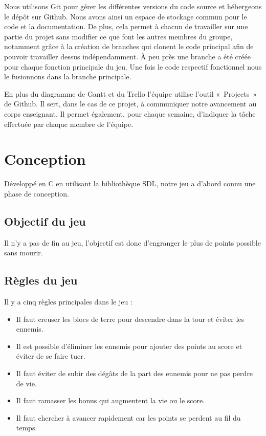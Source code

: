 \documentclass[a4paper,12pt]{article}
\begin{document}
Nous utilisons Git pour gérer les différentes versions du code source et hébergeons le dépôt sur Github.
Nous avons ainsi un espace de stockage commun pour le code et la documentation. De plus, cela permet à chacun de travailler sur une partie du projet sans modifier ce que font les autres membres du groupe, notamment grâce à la création de branches qui clonent le code principal afin de pouvoir travailler dessus indépendamment.
À peu près une branche a été créée pour chaque fonction principale du jeu. Une fois le code respectif fonctionnel nous le fusionnons dans la branche principale.

En plus du diagramme de Gantt et du Trello l’équipe utilise l’outil « Projects » de Github.
Il sert, dans le cas de ce projet, à communiquer notre avancement au corps enseignant. 
Il permet également, pour chaque semaine, d’indiquer la tâche effectuée par chaque membre de l’équipe.



\section{Conception}

Développé en C en utilisant la bibliothèque SDL, notre jeu a d'abord connu une phase de conception.

\subsection{Objectif du jeu}
Il n’y a pas de fin au jeu, l’objectif est donc d’engranger le plus de points possible sans mourir.

\subsection{Règles du jeu}
Il y a cinq règles principales dans le jeu :
\begin{itemize}
	\item Il faut creuser les blocs de terre pour descendre dans la tour et éviter les ennemis.
	\item Il est possible d’éliminer les ennemis pour ajouter des points au score et éviter de se faire tuer.
	\item Il faut éviter de subir des dégâts de la part des ennemis pour ne pas perdre de vie.
	\item Il faut ramasser les bonus qui augmentent la vie ou le score.
	\item Il faut chercher à avancer rapidement car les points se perdent au fil du temps.
\end{itemize}
\end{document}
